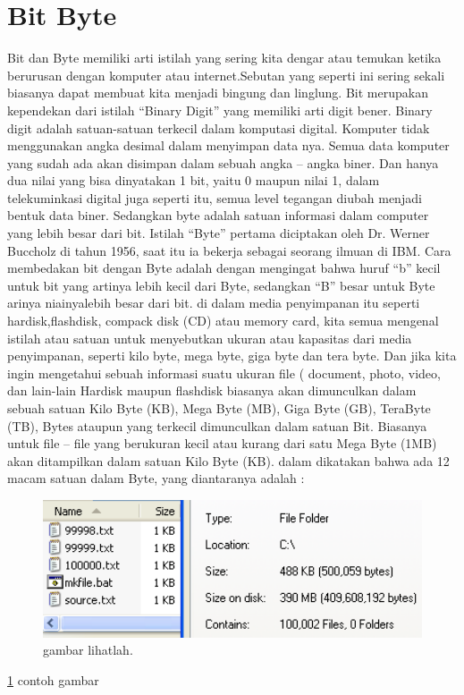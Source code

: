 ﻿%

\section {Bit Byte}
Bit dan Byte memiliki arti istilah yang sering kita dengar atau temukan ketika berurusan dengan komputer atau internet.Sebutan yang seperti ini sering sekali biasanya dapat membuat kita menjadi bingung dan linglung. Bit merupakan kependekan dari istilah “Binary Digit” yang memiliki arti digit bener.
Binary digit adalah satuan-satuan terkecil dalam komputasi digital. Komputer tidak menggunakan angka desimal  dalam menyimpan data nya. Semua data komputer yang sudah ada akan disimpan dalam sebuah angka – angka biner. Dan hanya dua nilai yang bisa dinyatakan 1 bit, yaitu 0 maupun nilai 1, dalam telekuminkasi digital juga seperti itu, semua level tegangan diubah menjadi bentuk data biner.
Sedangkan byte adalah satuan informasi dalam computer yang lebih besar dari bit. Istilah “Byte” pertama diciptakan oleh Dr. Werner Buccholz di tahun 1956, saat itu ia bekerja sebagai seorang ilmuan di IBM. 
Cara membedakan bit dengan Byte adalah dengan mengingat bahwa  huruf “b” kecil untuk bit yang artinya lebih kecil dari Byte, sedangkan “B” besar untuk Byte arinya niainyalebih besar dari bit.
di dalam media penyimpanan itu seperti hardisk,flashdisk, compack disk (CD) atau memory card, kita semua mengenal istilah atau satuan untuk menyebutkan ukuran atau kapasitas dari media penyimpanan, seperti kilo byte, mega byte, giga byte dan tera byte. Dan jika kita ingin mengetahui sebuah informasi suatu ukuran file ( document, photo, video, dan lain-lain
Hardisk maupun flashdisk biasanya akan dimunculkan dalam sebuah satuan Kilo Byte (KB), Mega Byte (MB), Giga Byte (GB), TeraByte (TB), Bytes ataupun yang terkecil dimunculkan dalam satuan Bit. Biasanya untuk file – file yang berukuran kecil atau kurang dari satu Mega Byte (1MB) akan ditampilkan dalam satuan Kilo Byte (KB).
dalam \cite{tucker2012bit} dikatakan bahwa ada 12 macam satuan dalam Byte, yang diantaranya adalah :

\begin{figure}[ht]
\centerline{\includegraphics[width=1\textwidth]{figures/lihatlah.png}}
\caption{gambar lihatlah.}
\label{lihatlah}
\end{figure}
\ref{lihatlah}
contoh gambar

